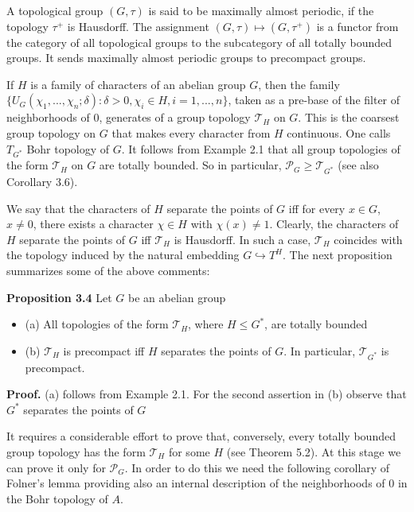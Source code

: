 \documentclass[12pt]{article}
\begin{document}
    A topological group $(G, \tau)$ is said to be maximally almost periodic, if the topology $\tau^+$ is Hausdorff. The assignment
$(G, \tau) \mapsto (G, \tau^+)$ is a functor from the category of all topological groups to the subcategory of all totally bounded groups. It
sends maximally almost periodic groups to precompact groups.


    If $H$ is a family of characters of an abelian group $G$, then the family $\{U_G(\chi_1,...,\chi_n; \delta): \delta > 0, \chi_i \in H, i = 1,...,n\}$,
taken as a pre-base of the filter of neighborhoods of 0, generates of a group topology $\mathcal{T}_H$ on $G$. This is the coarsest
group topology on $G$ that makes every character from $H$ continuous. One calls $T_{G^*}$ Bohr topology of $G$. It follows from
Example 2.1 that all group topologies of the form $\mathcal{T}_H$ on $G$ are totally bounded. So in particular, $\mathcal{P}_G \geqslant \mathcal{T}_{G^*}$ (see also Corollary 3.6).


    We say that the characters of $H$ separate the points of $G$ iff for every $x \in G$, $x \neq 0$, there exists a character $\chi \in H$ with
$\chi(x) \neq 1$. Clearly, the characters of $H$ separate the points of $G$ iff $\mathcal{T}_H$ is Hausdorff. In such a case, $\mathcal{T}_H$ coincides with
the topology induced by the natural embedding $G \hookrightarrow T^H$. The next proposition summarizes some of the above comments:


\textbf{Proposition 3.4} Let $G$ be an abelian group


    \begin{itemize}
        
        \item (a) All topologies of the form $\mathcal{T}_H$, where $H \leqslant G^*$, are totally bounded    
        
        \item (b) $\mathcal{T}_H$ is precompact iff $H$ separates the points of $G$. In particular, $\mathcal{T}_{G^*}$ is precompact.
        
    \end{itemize}


\textbf{Proof.} (a) follows from Example 2.1. For the second assertion in (b) observe that $G^*$ separates the points of $G$


    It requires a considerable effort to prove that, conversely, every totally bounded group topology has the form $\mathcal{T}_H$ for
some $H$ (see Theorem 5.2). At this stage we can prove it only for $\mathcal{P}_G$. In order to do this we need the following corollary of
Folner's lemma providing also an internal description of the neighborhoods of 0 in the Bohr topology of $A$.
\end{document}
